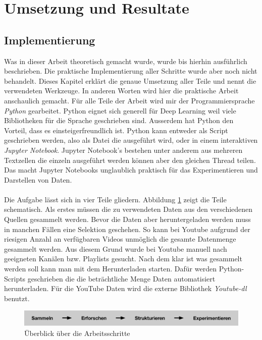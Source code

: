 \section{Umsetzung und Resultate}

\subsection{Implementierung}

Was in dieser Arbeit theoretisch gemacht wurde, wurde bis hierhin ausführlich beschrieben. Die praktische Implementierung aller Schritte wurde aber noch nicht behandelt. Dieses Kapitel erklärt die genaue Umsetzung aller Teile und nennt die verwendeten Werkzeuge. In anderen Worten wird hier die praktische Arbeit anschaulich gemacht.
Für alle Teile der Arbeit wird mir der Programmiersprache \textit{Python}  gearbeitet. Python eignet sich generell für Deep Learning weil viele Bibliotheken für die Sprache geschrieben sind. Ausserdem hat Python den Vorteil, dass es einsteigerfreundlich ist. Python kann entweder als Script geschrieben werden, also als Datei die ausgeführt wird, oder in einem interaktiven \textit{Jupyter Notebook}\parencite{jupyter}. Jupyter Notebook's  bestehen unter anderem aus mehreren Textzellen die einzeln ausgeführt werden können aber den gleichen Thread teilen. Das macht Jupyter Notebooks unglaublich praktisch für das Experimentieren und Darstellen von Daten.
\\ \\
Die Aufgabe lässt sich in vier Teile gliedern. Abbildung \ref{img:vorgehen} zeigt die Teile schematisch. 
Als erstes müssen die zu verwendeten Daten aus den verschiedenen Quellen gesammelt werden. Bevor die Daten aber heruntergeladen werden muss in manchen Fällen eine Selektion geschehen. So kann bei Youtube aufgrund der riesigen Anzahl an verfügbaren Videos unmöglich die gesamte Datenmenge gesammelt werden. Aus diesem Grund wurde bei Youtube manuell nach geeigneten Kanälen bzw. Playlists gesucht. Nach dem klar ist was gesammelt werden soll kann man mit dem Herunterladen starten. Dafür werden Python-Scripts geschrieben die die beträchtliche Menge Daten automatisiert herunterladen. Für die YouTube Daten wird die externe Bibliothek \textit{Youtube-dl}\parencite{youtube-dl} benutzt.

 \begin{figure}[hbt]
	\centering
		\includegraphics[width=1.0\textwidth]{assets/vorgang_small.png}
	\caption{Überblick über die Arbeitsschritte}
	\label{img:vorgehen}
\end{figure}

